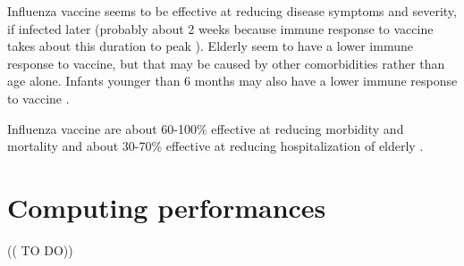 \documentclass[11pt, onecolumn]{article}
\begin{document}
Influenza vaccine seems to be effective at reducing disease symptoms and severity, if infected later (probably about 2 weeks because immune response to vaccine takes about this duration to peak \cite{Cox:2004vo}). 
Elderly seem to have a lower immune response to vaccine, but that may be caused by other comorbidities rather than age alone. Infants younger than 6 months may also have a lower immune response to vaccine \cite{Cox:2004vo}.

Influenza vaccine are about 60-100\% effective at reducing morbidity and mortality and about 30-70\% effective at reducing hospitalization of elderly  \cite{Cox:2004vo}.


\section{Computing performances}

(( TO DO))


\newpage



\end{document}
